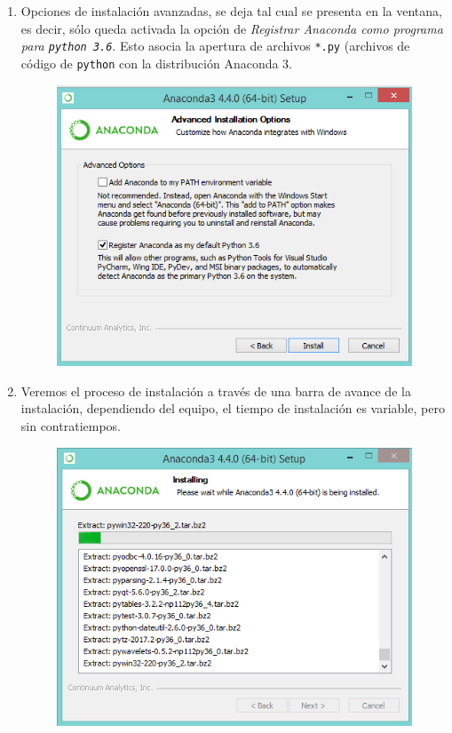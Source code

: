 \documentclass[12pt]{article}
\begin{document}
\begin{enumerate}
\begin{figure}[H]
\end{figure}
\item Opciones de instalación avanzadas, se deja tal cual se presenta en la ventana, es decir, sólo queda activada la opción de \emph{Registrar Anaconda como programa para \texttt{python 3.6}}. Esto asocia la apertura de archivos \texttt{*.py} (archivos de código de \texttt{python} con la distribución Anaconda 3.
\begin{figure}[H]
	\centering
	\includegraphics[scale=0.5]{Imagenes/Instalacion_Anaconda_Windows_07} 
\end{figure}
\item Veremos el proceso de instalación a través de una barra de avance de la instalación, dependiendo del equipo, el tiempo de instalación es variable, pero sin contratiempos.
\begin{figure}[H]
	\centering
	\includegraphics[scale=0.5]{Imagenes/Instalacion_Anaconda_Windows_08} 

\end{figure}
\end{enumerate}
\end{document}
